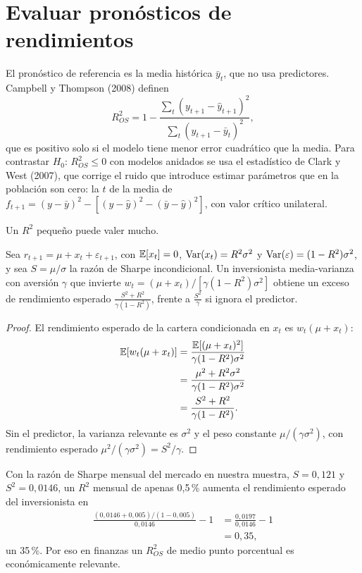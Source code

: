 \section{Evaluar pronósticos de rendimientos}

El pronóstico de referencia es la media histórica $\bar y_t$, que no usa predictores. Campbell y Thompson (2008) definen
\[
  R^2_{OS}=1-\frac{\sum_t(y_{t+1}-\hat y_{t+1})^2}{\sum_t(y_{t+1}-\bar y_t)^2},
\]
que es positivo solo si el modelo tiene menor error cuadrático que la media. Para contrastar $H_0$: $R^2_{OS}\le0$ con modelos
anidados se usa el estadístico de Clark y West (2007), que corrige el ruido que introduce estimar parámetros que en la
población son cero: la $t$ de la media de $f_{t+1}=(y-\bar y)^2-[(y-\hat y)^2-(\bar y-\hat y)^2]$, con valor crítico unilateral.

Un $R^2$ pequeño puede valer mucho.

\begin{proposicion}\label{prop:ct}
Sea $r_{t+1}=\mu+x_t+\varepsilon_{t+1}$, con $\mathbb{E}[x_t]=0$, $\operatorname{Var}(x_t)=R^2\sigma^2$ y $\operatorname{Var}(\varepsilon)=(1-R^2)\sigma^2$, y sea $S=\mu/\sigma$ la razón de
Sharpe incondicional. Un inversionista media-varianza con aversión $\gamma$ que invierte $w_t=(\mu+x_t)/[\gamma(1-R^2)\sigma^2]$ obtiene un
exceso de rendimiento esperado $\frac{S^2+R^2}{\gamma(1-R^2)}$, frente a $\frac{S^2}{\gamma}$ si ignora el predictor.
\end{proposicion}

\begin{proof}
El rendimiento esperado de la cartera condicionada en $x_t$ es $w_t(\mu+x_t)$:
\begin{align*}
  \mathbb{E}[w_t(\mu+x_t)] &= \frac{\mathbb{E}[(\mu+x_t)^2]}{\gamma(1-R^2)\sigma^2}\\
                   &= \frac{\mu^2+R^2\sigma^2}{\gamma(1-R^2)\sigma^2}\\
                   &= \frac{S^2+R^2}{\gamma(1-R^2)} .
\end{align*}
Sin el predictor, la varianza relevante es $\sigma^2$ y el peso constante $\mu/(\gamma\sigma^2)$, con rendimiento esperado
$\mu^2/(\gamma\sigma^2)=S^2/\gamma$.
\end{proof}

Con la razón de Sharpe mensual del mercado en nuestra muestra, $S=0{,}121$ y $S^2=0{,}0146$, un $R^2$ mensual de apenas 0,5\,\% aumenta el
rendimiento esperado del inversionista en
\begin{align*}
  \frac{(0{,}0146+0{,}005)/(1-0{,}005)}{0{,}0146}-1 &= \frac{0{,}0197}{0{,}0146}-1\\
                                                    &= 0{,}35,
\end{align*}
un 35\,\%. Por eso en finanzas un $R^2_{OS}$ de medio punto porcentual es económicamente relevante.

